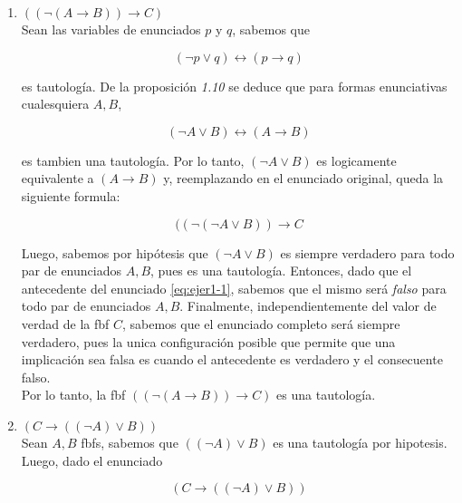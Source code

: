 \documentclass[osajnl,twocolumn,showpacs,superscriptaddress,10pt]{revtex4-1} %
\begin{document}
\begin{enumerate}
  \item $((\neg (A \rightarrow B)) \rightarrow C)$ \\

  Sean las variables de enunciados $p$ y $q$, sabemos que

  \begin{equation}
    (\neg p \vee q) \leftrightarrow (p \rightarrow q)
  \end{equation}

  es tautología. De la proposición \textit{1.10} se deduce que para formas enunciativas cualesquiera $A, B$,\

  \begin{equation}
    (\neg A \vee B) \leftrightarrow (A \rightarrow B)
  \end{equation}

  es tambien una tautología. Por lo tanto, $(\neg A \vee B)$ es logicamente equivalente a $(A \rightarrow B)$ y, reemplazando en el enunciado original, queda la siguiente formula:

  \begin{equation}
    ((\neg (\neg A \vee B)) \rightarrow C
    \label{eq:ejer1-1}
  \end{equation}

  Luego, sabemos por hipótesis que $(\neg A \vee B)$ es siempre verdadero para todo par de enunciados $A, B$, pues es una tautología. Entonces, dado que el antecedente del enunciado \ref{eq:ejer1-1}, sabemos que el mismo será \textit{falso} para todo par de enunciados $A, B$. Finalmente, independientemente del valor de verdad de la fbf $C$, sabemos que el enunciado completo será siempre verdadero, pues la unica configuración posible que permite que una implicación sea falsa es cuando el antecedente es verdadero y el consecuente falso. \\

  Por lo tanto, la fbf $((\neg (A \rightarrow B)) \rightarrow C)$ es una tautología. \\

  \item $(C \rightarrow ((\neg A) \vee B))$ \\

  Sean $A, B$ fbfs, sabemos que $((\neg A) \vee B)$ es una tautología por hipotesis. Luego, dado el enunciado

  \begin{equation}
    (C \rightarrow ((\neg A) \vee B))
  \end{equation}


\end{enumerate}
\end{document}
